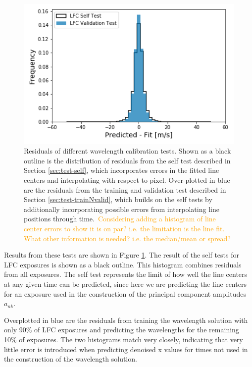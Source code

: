 \documentclass[twocolumn]{aastex63}
\newcommand{\lz}[1]{\textcolor{orange}{#1}}
\begin{document}
\begin{figure}[h]
\centering
\includegraphics[width=.5\textwidth]{Figures/lfcgood.png}
\caption{Residuals of different wavelength calibration tests.  Shown as a black outline is the distribution of residuals from the self test described in Section \ref{sec:test-self}, which incorporates errors in the fitted line centers and interpolating with respect to pixel.  Over-plotted in blue are the residuals from the training and validation test described in Section \ref{sec:test-trainNvalid}, which builds on the self tests by additionally incorporating possible errors from interpolating line positions through time.\
\lz{Considering adding a histogram of line center errors to show it is on par?  i.e. the limitation is the line fit.  What other information is needed?  i.e. the median/mean or spread?}}
\label{fig:testHists}
\end{figure} 

Results from these tests are shown in Figure \ref{fig:testHists}.  The result of the self tests for LFC exposures is shown as a black outline.  This histogram combines residuals from all exposures.  The self test represents the limit of how well the line centers at any given time can be predicted, since here we are predicting the line centers for an exposure used in the construction of the principal component amplitudes $a_{nk}$. 

Overplotted in blue are the residuals from training the wavelength solution with only 90\% of LFC exposures and predicting the wavelengths for the remaining 10\% of exposures.  The two histograms match very closely, indicating that very little error is introduced when predicting denoised x values for times not used in the construction of the wavelength solution.
\end{document}
